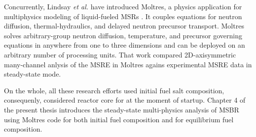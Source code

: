 Concurrently, Lindsay \emph{et al.} have introduced Moltres, a physics application for multiphysics modeling of liquid-fueled \glspl{MSR} \cite{lindsay_introduction_2018}. It couples equations for neutron diffusion, thermal-hydraulics, and delayed neutron precursor transport. Moltres solves arbitrary-group neutron diffusion, temperature, and precursor governing equations in anywhere from one to three dimensions and can be deployed on an arbitrary number of processing units. That work compared 2D-axisymmetric many-channel anlysis of the \gls{MSRE} in Moltres agains experimental \gls{MSRE} data in steady-state mode.

On the whole, all these research efforts used initial fuel salt composition, consequenly, considered reactor core for at the moment of startup. Chapter 4 of the present thesis introduces the steady-state multi-physics analysis of \gls{MSBR} using Moltres code for both initial fuel composition and for equilibrium fuel composition.


